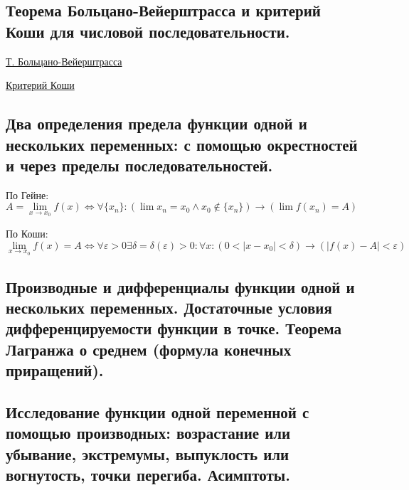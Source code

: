 \documentclass{article}
\begin{document}
\subsection{Теорема Больцано-Вейерштрасса и критерий Коши для числовой
последовательности.}


\href{https://ru.wikipedia.org/wiki/%D0%A2%D0%B5%D0%BE%D1%80%D0%B5%D0%BC%D0%B0_%D0%91%D0%BE%D0%BB%D1%8C%D1%86%D0%B0%D0%BD%D0%BE_%E2%80%94_%D0%92%D0%B5%D0%B9%D0%B5%D1%80%D1%88%D1%82%D1%80%D0%B0%D1%81%D1%81%D0%B0}{Т. Больцано-Вейерштрасса}


\href{https://ru.wikipedia.org/wiki/%D0%9A%D1%80%D0%B8%D1%82%D0%B5%D1%80%D0%B8%D0%B9_%D0%9A%D0%BE%D1%88%D0%B8}{Критерий Коши}


\subsection{Два определения предела функции одной и нескольких переменных:
с помощью окрестностей и через пределы последовательностей.}

По Гейне:
$A = \lim\limits_{x \to x_0} f(x) \iff
\forall \{x_n\}: (\lim x_n = x_0 \wedge x_0 \notin \{x_n\})
\rightarrow (\lim f(x_n) = A)$

По Коши:
$\lim\limits_{x \to x_0} f(x) = A \iff
\forall \varepsilon > 0 \exists \delta = \delta(\varepsilon) > 0:
\forall x : (0 < |x - x_0| < \delta) \rightarrow (|f(x) - A| < \varepsilon)$


\subsection{Производные и дифференциалы функции одной и нескольких
переменных. Достаточные условия дифференцируемости функции в
точке. Теорема Лагранжа о среднем (формула конечных приращений).}



\subsection{Исследование функции одной переменной с помощью производных:
возрастание или убывание, экстремумы, выпуклость или вогнутость, точки перегиба. Асимптоты.}
\end{document}
